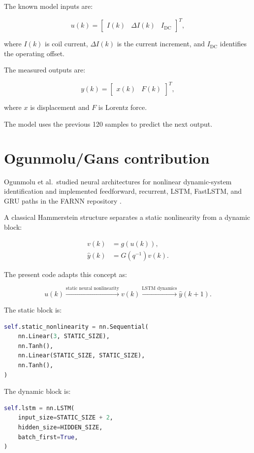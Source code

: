 \documentclass[11pt]{article}
\begin{document}
The known model inputs are:

\[
u(k)=
\begin{bmatrix}
I(k) &
\Delta I(k) &
I_{\mathrm{DC}}
\end{bmatrix}^{T},
\]

where $I(k)$ is coil current, $\Delta I(k)$ is the current increment, and $I_{\mathrm{DC}}$ identifies the operating offset.

The measured outputs are:

\[
y(k)=
\begin{bmatrix}
x(k) &
F(k)
\end{bmatrix}^{T},
\]

where $x$ is displacement and $F$ is Lorentz force.

The model uses the previous 120 samples to predict the next output.

\section{Ogunmolu/Gans contribution}

Ogunmolu et al.\ studied neural architectures for nonlinear dynamic-system identification and implemented feedforward, recurrent, LSTM, FastLSTM, and GRU paths in the FARNN repository \cite{ogunmolu2016,farnnrepo}.

A classical Hammerstein structure separates a static nonlinearity from a dynamic block:

\begin{align}
v(k)&=g(u(k)),\\
\hat y(k)&=G(q^{-1})v(k).
\end{align}

The present code adapts this concept as:

\[
u(k)
\xrightarrow{\text{static neural nonlinearity}}
v(k)
\xrightarrow{\text{LSTM dynamics}}
\hat y(k+1).
\]

The static block is:

\begin{lstlisting}[language=Python]
self.static_nonlinearity = nn.Sequential(
    nn.Linear(3, STATIC_SIZE),
    nn.Tanh(),
    nn.Linear(STATIC_SIZE, STATIC_SIZE),
    nn.Tanh(),
)
\end{lstlisting}

The dynamic block is:

\begin{lstlisting}[language=Python]
self.lstm = nn.LSTM(
    input_size=STATIC_SIZE + 2,
    hidden_size=HIDDEN_SIZE,
    batch_first=True,
)
\end{lstlisting}
\end{document}
